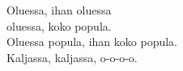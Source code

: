
Oluessa, ihan oluessa \\ oluessa, koko popula. \\ Oluessa popula, ihan koko popula. \\ Kaljassa, kaljassa, o-o-o-o.